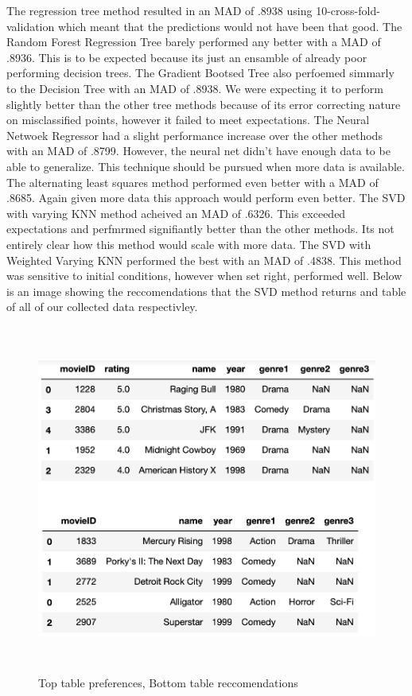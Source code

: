 \documentclass[review,onefignum,onetabnum]{siamart171218}
\begin{document}
The regression tree method resulted in an MAD of .8938 using 10-cross-fold-validation which meant that the predictions would not have been that good. The Random Forest Regression Tree barely performed any better with a MAD of .8936. This is to be expected because its just an ensamble of already poor performing decision trees. The Gradient Bootsed Tree also perfoemed simmarly to the Decision Tree with an MAD of .8938. We were expecting it to perform slightly better than the other tree methods because of its error correcting nature on misclassified points, however it failed to meet expectations. The Neural Netwoek Regressor had a slight performance increase over the other methods with an MAD of .8799. However, the neural net didn't have enough data to be able to generalize. This technique should be pursued when more data is available. The alternating least squares method performed even better with a MAD of .8685. Again given more data this approach would perform even better. The SVD with varying KNN method acheived an MAD of .6326. This exceeded expectations and perfmrmed signifiantly better than the other methods. Its not entirely clear how this method would scale with more data. The SVD with Weighted Varying KNN performed the best with an MAD of .4838. This method was sensitive to initial conditions, however when set right, performed well. Below is an image showing the reccomendations that the SVD method returns and table of all of our collected data respectivley.
\begin{figure}[H]
  \centering
    \includegraphics[width=14cm, height=11.5cm]{reccomendations}
  \caption{Top table preferences, Bottom table reccomendations}
  \label{fig:reccomendations}
\end{figure}
\end{document}
